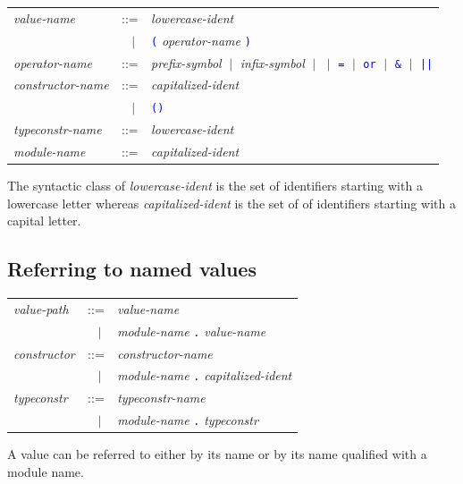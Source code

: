 \documentclass[11pt,titlepage,twoside]{report}
\newcommand{\alt}{\;|\;}
\newcommand{\term}[1]{\textcolor{Blue}{\tt #1}}
\newcommand{\nterm}[1]{\textcolor{BrickRed}{\it #1}}
\newcommand{\term}[1]{{\tt #1}}
\newcommand{\nterm}[1]{{\em #1}}
\begin{document}
\begin{center}
\begin{tabular}{lcl}
\nterm{value-name}       & ::=    & \nterm{lowercase-ident} \\
                         & $\;\;\alt$ & \term{(} \nterm{operator-name}
                                        \term{)} \\
\nterm{operator-name}    & ::=    & \nterm{prefix-symbol} 
                           $\alt$   \nterm{infix-symbol} 
                           $\alt$   \term{*} $\alt$ \term{=} $\alt$ \term{or}
                           $\alt$   \term{\&} $\alt$ \term{||} \\
\nterm{constructor-name} & ::=    & \nterm{capitalized-ident} \\
                         & $\;\;\alt$ & \term{()} \\
\nterm{typeconstr-name}  & ::=    & \nterm{lowercase-ident} \\
\nterm{module-name}      & ::=    & \nterm{capitalized-ident}
\end{tabular}
\end{center}

The syntactic class of \nterm{lowercase-ident} is the
set of identifiers starting with a lowercase letter whereas
\nterm{capitalized-ident} is the set of of identifiers starting with a
capital letter.

\subsection{Referring to named values\label{refnamedvalues}} %

\begin{center}
\begin{tabular}{lcl}
\nterm{value-path}  & ::=        & \nterm{value-name} \\
                    & $\;\;\alt$ & \nterm{module-name} \term{.}
                                   \nterm{value-name} \\
\nterm{constructor} & ::=        & \nterm{constructor-name} \\
                    & $\;\;\alt$ & \nterm{module-name} \term{.}
                                   \nterm{capitalized-ident} \\
\nterm{typeconstr}  & ::=        & \nterm{typeconstr-name} \\
                    & $\;\;\alt$ & \nterm{module-name} \term{.} 
                                   \nterm{typeconstr}
\end{tabular}
\end{center}
A value can be referred to either by its name or by its name qualified with 
a module name.
\end{document}
